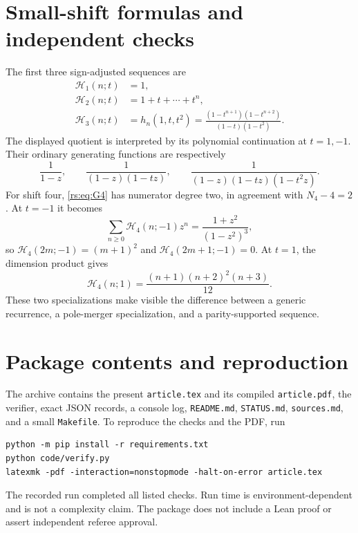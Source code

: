\documentclass[11pt]{article}
\theoremstyle{definition}
\theoremstyle{remark}
\newcommand{\Ht}{\mathcal H}
\theoremstyle{definition}
\theoremstyle{plain}
\numberwithin{equation}{section}
\begin{document}

\renewcommand{\thesection}{\Alph{section}}
\renewcommand{\theHsection}{rs.app.\Alph{section}}
\setcounter{section}{2}
\section{Small-shift formulas and independent checks}
\label{rs:app:examples}
The first three sign-adjusted sequences are
\begin{align*}
 \Ht_1(n;t)&=1,\\
 \Ht_2(n;t)&=1+t+\cdots+t^n,\\
 \Ht_3(n;t)&=h_n(1,t,t^2)
 =\frac{(1-t^{n+1})(1-t^{n+2})}{(1-t)(1-t^2)}.
\end{align*}
The displayed quotient is interpreted by its polynomial continuation at
$t=1,-1$. Their ordinary generating functions are respectively
\[
 \frac1{1-z},\qquad
 \frac1{(1-z)(1-tz)},\qquad
 \frac1{(1-z)(1-tz)(1-t^2z)}.
\]
For shift four, \eqref{rs:eq:G4} has numerator degree two, in agreement with
$N_4-4=2$. At $t=-1$ it becomes
\[
 \sum_{n\ge0}\Ht_4(n;-1)z^n=\frac{1+z^2}{(1-z^2)^3},
\]
so $\Ht_4(2m;-1)=(m+1)^2$ and $\Ht_4(2m+1;-1)=0$.
At $t=1$, the dimension product gives
\[
 \Ht_4(n;1)=\frac{(n+1)(n+2)^2(n+3)}{12}.
\]
These two specializations make visible the difference between a generic
recurrence, a pole-merger specialization, and a parity-supported sequence.

\section{Package contents and reproduction}
\label{rs:app:package}
The archive contains the present \texttt{article.tex} and its compiled
\texttt{article.pdf}, the verifier, exact JSON records, a console log,
\texttt{README.md}, \texttt{STATUS.md}, \texttt{sources.md}, and a small
\texttt{Makefile}. To reproduce the checks and the PDF, run
\begin{verbatim}
python -m pip install -r requirements.txt
python code/verify.py
latexmk -pdf -interaction=nonstopmode -halt-on-error article.tex
\end{verbatim}
The recorded run completed all listed checks. Run time is environment-dependent
and is not a complexity claim. The package does not include a Lean proof or
assert independent referee approval.
\end{document}
